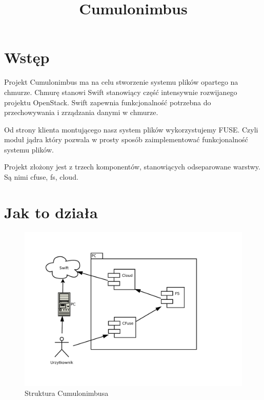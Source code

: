 

\usepackage{microtype}


\title{Cumulonimbus}
\author{}


\maketitle

\section{Wstęp}

Projekt Cumulonimbus ma na celu stworzenie systemu plików opartego na chmurze. Chmurę stanowi Swift stanowiący część intensywnie rozwijanego projektu OpenStack. Swift zapewnia funkcjonalność potrzebna do przechowywania i zrządzania danymi w chmurze. 

Od strony klienta montującego nasz system plików wykorzystujemy FUSE. Czyli moduł jądra który pozwala w prosty sposób zaimplementować funkcjonalność systemu plików. 

Projekt złożony jest z trzech komponentów, stanowiących odseparowane warstwy. Są nimi cfuse, fs, cloud.

\section{Jak to działa}
\begin{figure}[htb]
\begin{center}
\leavevmode
\includegraphics[width=\textwidth]{arch_komunikacja2.pdf}
\end{center}
\caption{Struktura Cumulonimbusa}
\label{fig:dia_arch_komunikacja}
\end{figure}

